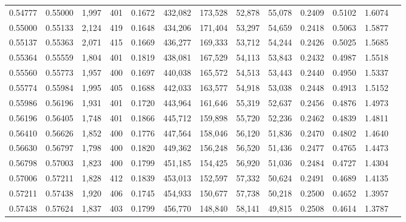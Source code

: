 \begin{tabular}{rrrrrrrrrrrrr}
0.54777 & 0.55000 &  1,997 &   401 &                                     0.1672 & 432,082 & 173,528 &  52,878 &  55,078 & 0.2409 & 0.5102 & 1.6074 \\
0.55000 & 0.55133 &  2,124 &   419 &                                     0.1648 & 434,206 & 171,404 &  53,297 &  54,659 & 0.2418 & 0.5063 & 1.5877 \\
0.55137 & 0.55363 &  2,071 &   415 &                                     0.1669 & 436,277 & 169,333 &  53,712 &  54,244 & 0.2426 & 0.5025 & 1.5685 \\
0.55364 & 0.55559 &  1,804 &   401 &                                     0.1819 & 438,081 & 167,529 &  54,113 &  53,843 & 0.2432 & 0.4987 & 1.5518 \\
0.55560 & 0.55773 &  1,957 &   400 &                                     0.1697 & 440,038 & 165,572 &  54,513 &  53,443 & 0.2440 & 0.4950 & 1.5337 \\
0.55774 & 0.55984 &  1,995 &   405 &                                     0.1688 & 442,033 & 163,577 &  54,918 &  53,038 & 0.2448 & 0.4913 & 1.5152 \\
0.55986 & 0.56196 &  1,931 &   401 &                                     0.1720 & 443,964 & 161,646 &  55,319 &  52,637 & 0.2456 & 0.4876 & 1.4973 \\
0.56196 & 0.56405 &  1,748 &   401 &                                     0.1866 & 445,712 & 159,898 &  55,720 &  52,236 & 0.2462 & 0.4839 & 1.4811 \\
0.56410 & 0.56626 &  1,852 &   400 &                                     0.1776 & 447,564 & 158,046 &  56,120 &  51,836 & 0.2470 & 0.4802 & 1.4640 \\
0.56630 & 0.56797 &  1,798 &   400 &                                     0.1820 & 449,362 & 156,248 &  56,520 &  51,436 & 0.2477 & 0.4765 & 1.4473 \\
0.56798 & 0.57003 &  1,823 &   400 &                                     0.1799 & 451,185 & 154,425 &  56,920 &  51,036 & 0.2484 & 0.4727 & 1.4304 \\
0.57006 & 0.57211 &  1,828 &   412 &                                     0.1839 & 453,013 & 152,597 &  57,332 &  50,624 & 0.2491 & 0.4689 & 1.4135 \\
0.57211 & 0.57438 &  1,920 &   406 &                                     0.1745 & 454,933 & 150,677 &  57,738 &  50,218 & 0.2500 & 0.4652 & 1.3957 \\
0.57438 & 0.57624 &  1,837 &   403 &                                     0.1799 & 456,770 & 148,840 &  58,141 &  49,815 & 0.2508 & 0.4614 & 1.3787 \\

\end{tabular}
